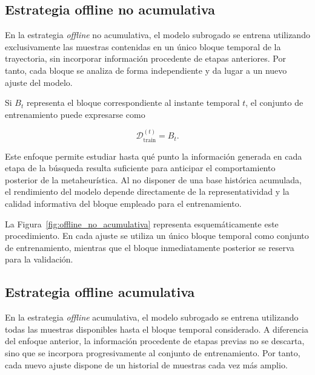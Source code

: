 \subsection{Estrategia offline no acumulativa}


En la estrategia \textit{offline} no acumulativa, el modelo subrogado se entrena utilizando exclusivamente las muestras contenidas en un único bloque temporal de la trayectoria, sin incorporar información procedente de etapas anteriores. Por tanto, cada bloque se analiza de forma independiente y da lugar a un nuevo ajuste del modelo.

Si \(B_t\) representa el bloque correspondiente al instante temporal \(t\), el conjunto de entrenamiento puede expresarse como

\begin{equation}
    \mathcal{D}_{\text{train}}^{(t)} = B_t.
\end{equation}

Este enfoque permite estudiar hasta qué punto la información generada en cada etapa de la búsqueda resulta suficiente para anticipar el comportamiento posterior de la metaheurística. Al no disponer de una base histórica acumulada, el rendimiento del modelo depende directamente de la representatividad y la calidad informativa del bloque empleado para el entrenamiento.

La Figura~\ref{fig:offline_no_acumulativa} representa esquemáticamente este
procedimiento. En cada ajuste se utiliza un único bloque temporal como conjunto
de entrenamiento, mientras que el bloque inmediatamente posterior se reserva
para la validación.



\subsection{Estrategia offline acumulativa}

En la estrategia \textit{offline} acumulativa, el modelo subrogado se entrena utilizando todas las muestras disponibles hasta el bloque temporal considerado. A diferencia del enfoque anterior, la información procedente de etapas previas no se descarta, sino que se incorpora progresivamente al conjunto de entrenamiento. Por tanto, cada nuevo ajuste dispone de un historial de muestras cada vez más amplio.

